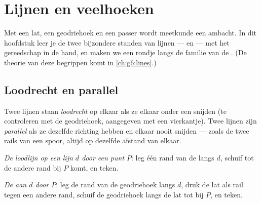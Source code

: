 \chapter{Lijnen en veelhoeken}\label{ch:g4:geometry}

Met een lat, een geodriehoek en een passer wordt meetkunde een ambacht. In
dit hoofdstuk leer je de twee bijzondere standen van lijnen ---
 en  --- met het gereedschap in de hand, en maken we een
rondje langs de familie van de . (De theorie van deze begrippen
komt in \cref{ch:g6:lines}.)

\section{Loodrecht en parallel}

\begin{definition}\label{def:g4:geometry:def}
Twee lijnen staan \emph{loodrecht} op elkaar als
ze elkaar onder een  snijden (te controleren met de
geodriehoek, aangegeven met een vierkantje). Twee lijnen zijn
\emph{parallel} als ze dezelfde richting hebben en
elkaar nooit snijden --- zoals de twee rails van een spoor, altijd op
dezelfde afstand van elkaar.
\end{definition}

\begin{method}\label{met:g4:geometry:draw}
\emph{De loodlijn op een lijn $d$ door een punt $P$}: leg één rand van de
 langs $d$, schuif tot de andere rand bij $P$ komt, en teken.

\emph{De  aan $d$ door $P$}: leg de rand van de geodriehoek langs
$d$, druk de lat als rail tegen een andere rand, schuif de geodriehoek
langs de lat tot bij $P$, en teken.
\end{method}

